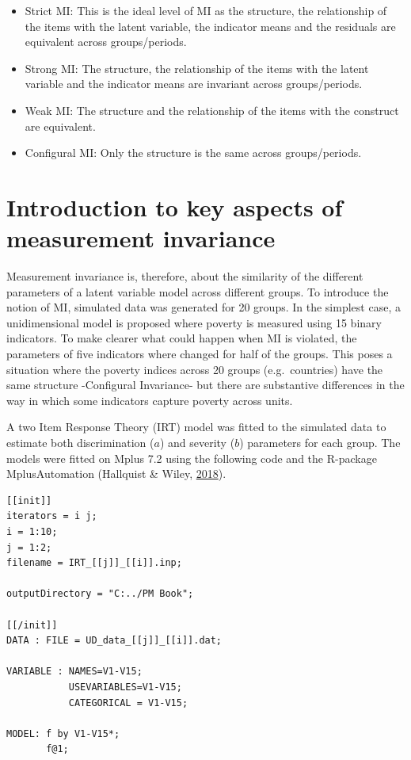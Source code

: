\documentclass[]{book}
\providecommand{\tightlist}{%
  \setlength{\itemsep}{0pt}\setlength{\parskip}{0pt}}
\begin{document}
\begin{itemize}
\tightlist
\item
  Strict MI: This is the ideal level of MI as the structure, the relationship of the items with the latent variable, the indicator means and the residuals are equivalent across groups/periods.
\item
  Strong MI: The structure, the relationship of the items with the latent variable and the indicator means are invariant across groups/periods.
\item
  Weak MI: The structure and the relationship of the items with the construct are equivalent.
\item
  Configural MI: Only the structure is the same across groups/periods.
\end{itemize}

\hypertarget{introduction-to-key-aspects-of-measurement-invariance}{%
\section{Introduction to key aspects of measurement invariance}\label{introduction-to-key-aspects-of-measurement-invariance}}

Measurement invariance is, therefore, about the similarity of the different parameters of a latent variable model across different groups. To introduce the notion of MI, simulated data was generated for 20 groups. In the simplest case, a unidimensional model is proposed where poverty is measured using 15 binary indicators. To make clearer what could happen when MI is violated, the parameters of five indicators where changed for half of the groups. This poses a situation where the poverty indices across 20 groups (e.g.~countries) have the same structure -Configural Invariance- but there are substantive differences in the way in which some indicators capture poverty across units.

A two Item Response Theory (IRT) model was fitted to the simulated data to estimate both discrimination (\(a\)) and severity (\(b\)) parameters for each group. The models were fitted on Mplus 7.2 using the following code and the R-package MplusAutomation (Hallquist \& Wiley, \protect\hyperlink{ref-Hallquist2018}{2018}).

\begin{verbatim}
[[init]]
iterators = i j;
i = 1:10;
j = 1:2;
filename = IRT_[[j]]_[[i]].inp;

outputDirectory = "C:../PM Book";

[[/init]]
DATA : FILE = UD_data_[[j]]_[[i]].dat;

VARIABLE : NAMES=V1-V15; 
           USEVARIABLES=V1-V15; 
           CATEGORICAL = V1-V15;
           
MODEL: f by V1-V15*;
       f@1;
\end{verbatim}
\end{document}
